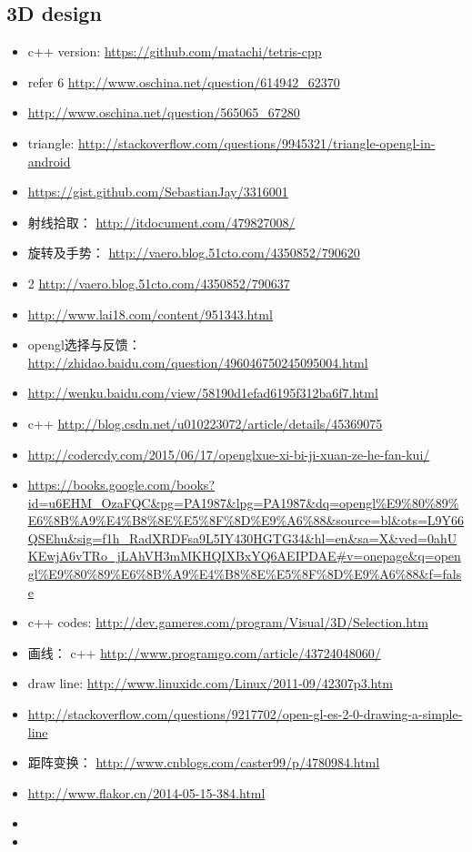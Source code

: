 \documentclass[9pt,b5paper]{article}
\begin{document}
\subsection{3D design}
\label{sec-2-1}
\begin{itemize}
\item c++ version: \url{https://github.com/matachi/tetris-cpp}
\item refer 6 \url{http://www.oschina.net/question/614942_62370}
\item \url{http://www.oschina.net/question/565065_67280}
\item triangle: \url{http://stackoverflow.com/questions/9945321/triangle-opengl-in-android}
\item \url{https://gist.github.com/SebastianJay/3316001}
\item 射线拾取： \url{http://itdocument.com/479827008/}
\item 旋转及手势： \url{http://vaero.blog.51cto.com/4350852/790620}
\item 2 \url{http://vaero.blog.51cto.com/4350852/790637}
\item \url{http://www.lai18.com/content/951343.html}
\item opengl选择与反馈： \url{http://zhidao.baidu.com/question/496046750245095004.html}
\item \url{http://wenku.baidu.com/view/58190d1efad6195f312ba6f7.html}
\item c++ \url{http://blog.csdn.net/u010223072/article/details/45369075}
\item \url{http://codercdy.com/2015/06/17/openglxue-xi-bi-ji-xuan-ze-he-fan-kui/}
\item \url{https://books.google.com/books?id=u6EHM_OzaFQC&pg=PA1987&lpg=PA1987&dq=opengl\%E9\%80\%89\%E6\%8B\%A9\%E4\%B8\%8E\%E5\%8F\%8D\%E9\%A6\%88&source=bl&ots=L9Y66QSEhu&sig=f1h_RadXRDFsa9L5IY430HGTG34&hl=en&sa=X&ved=0ahUKEwjA6vTRo_jLAhVH3mMKHQIXBxYQ6AEIPDAE#v=onepage&q=opengl\%E9\%80\%89\%E6\%8B\%A9\%E4\%B8\%8E\%E5\%8F\%8D\%E9\%A6\%88&f=false}
\item c++ codes: \url{http://dev.gameres.com/program/Visual/3D/Selection.htm}
\item 画线： c++ \url{http://www.programgo.com/article/43724048060/}
\item draw line: \url{http://www.linuxidc.com/Linux/2011-09/42307p3.htm}
\item \url{http://stackoverflow.com/questions/9217702/open-gl-es-2-0-drawing-a-simple-line}
\item 距阵变换： \url{http://www.cnblogs.com/caster99/p/4780984.html}
\item \url{http://www.flakor.cn/2014-05-15-384.html}
\item 
\item 
\end{itemize}
\end{document}
